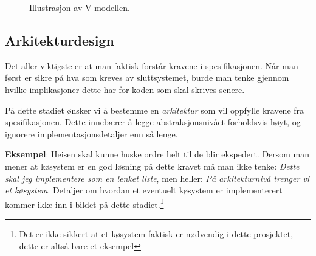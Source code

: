 \begin{figure}[ht]
{}
    \caption{Illustrasjon av V-modellen.}
    \label{fig:V-Modellen}
\end{figure}


\subsection{Arkitekturdesign}

Det aller viktigste er at man faktisk forstår kravene i spesifikasjonen. Når man først er sikre på hva som kreves av sluttsystemet, burde man tenke gjennom hvilke implikasjoner dette har for koden som skal skrives senere.

På dette stadiet ønsker vi å bestemme en \textit{arkitektur} som vil oppfylle kravene fra spesifikasjonen. Dette innebærer å legge abstraksjonsnivået forholdsvis høyt, og ignorere implementasjonsdetaljer enn så lenge.

\textbf{Eksempel}: Heisen skal kunne huske ordre helt til de blir ekspedert. Dersom man mener at køsystem er en god løsning på dette kravet må man ikke tenke: \textit{Dette skal jeg implementere som en lenket liste}, men heller: \textit{På arkitekturnivå trenger vi et køsystem}. Detaljer om hvordan et eventuelt køsystem er implementerert kommer ikke inn i bildet på dette stadiet.\footnote{Det er ikke sikkert at et køsystem faktisk er nødvendig i dette prosjektet, dette er altså bare et eksempel}

